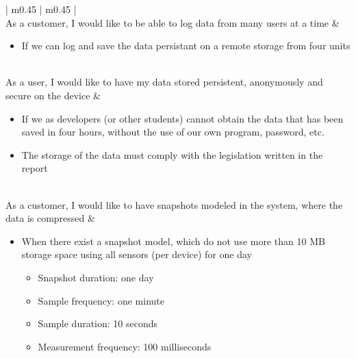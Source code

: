 \begin{center}
\begin{longtable}{| m{} | m{} |}
	 \\ \hline
	As a customer, I would like to be able to log data from many users at a time & 
	\begin{itemize}[noitemsep,topsep=0pt,parsep=0pt,partopsep=0pt]
	 	\item If we can log and save the data persistant on a remote storage from four units
	 \end{itemize} \\ \hline
	As a user, I would like to have my data stored persistent, anonymously and secure on the device & 
	\begin{itemize}[noitemsep,topsep=0pt,parsep=0pt,partopsep=0pt]
	 	\item If we as developers (or other students) cannot obtain the data that has been saved in four hours, without the use of our own program, password, etc.
	 	\item The storage of the data must comply with the legislation written in the report
	 \end{itemize} \\ \hline
	As a customer, I would like to have snapshots modeled in the system, where the data is compressed & 
	\begin{itemize}[noitemsep,topsep=0pt,parsep=0pt,partopsep=0pt]
	 	\item When there exist a snapshot model, which do not use more than 10 MB storage space using all sensors (per device) for one day
	 		\begin{itemize}[noitemsep,topsep=0pt,parsep=0pt,partopsep=0pt]
	 			\item Snapshot duration: one day
	 			\item Sample frequency: one minute
	 			\item Sample duration: 10 seconds
	 			\item Measurement frequency: 100 milliseconds
	 		\end{itemize}
	 \end{itemize} \\ \hline


\end{longtable}
\end{center}
